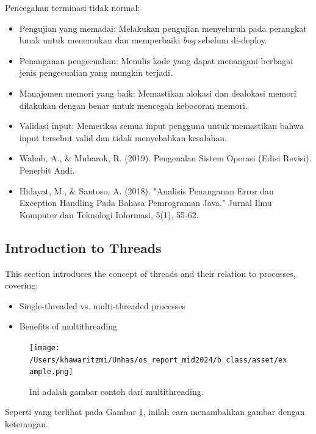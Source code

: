 \documentclass[12pt]{article}
\begin{document}
\begin{itemize}
    Pencegahan terminasi tidak normal:
    \begin{itemize}
        \item Pengujian yang memadai: Melakukan pengujian menyeluruh pada perangkat lunak untuk menemukan dan memperbaiki \textit{bug} sebelum di-deploy.
        \item Penanganan pengecualian: Menulis kode yang dapat menangani berbagai jenis pengecualian yang mungkin terjadi.
        \item Manajemen memori yang baik: Memastikan alokasi dan dealokasi memori dilakukan dengan benar untuk mencegah kebocoran memori.
        \item Validasi input: Memeriksa semua input pengguna untuk memastikan bahwa input tersebut valid dan tidak menyebabkan kesalahan.
    \end{itemize}
    
\end{itemize}
    
    \begin{itemize}
    \item {Wahab, A., & Mubarok, R. (2019). Pengenalan Sistem Operasi (Edisi Revisi). Penerbit Andi.}
    \item {Hidayat, M., & Santoso, A. (2018). "Analisis Penanganan Error dan Exception Handling Pada Bahasa Pemrograman Java." Jurnal Ilmu Komputer dan Teknologi Informasi, 5(1), 55-62.}
    \end{itemize}


\subsection{Introduction to Threads}
This section introduces the concept of threads and their relation to processes, covering:
\begin{itemize}
    \item Single-threaded vs. multi-threaded processes
    \item Benefits of multithreading
\end{itemize}

\begin{figure}[h]
    \centering
    \texttt{[image: /Users/khawaritzmi/Unhas/os\_report\_mid2024/b\_class/asset/example.png]}  %
    \caption{Ini adalah gambar contoh dari multithreading.}
    \label{fig:contoh_gambar}
\end{figure}

Seperti yang terlihat pada Gambar \ref{fig:contoh_gambar}, inilah cara menambahkan gambar dengan keterangan.
\end{document}
